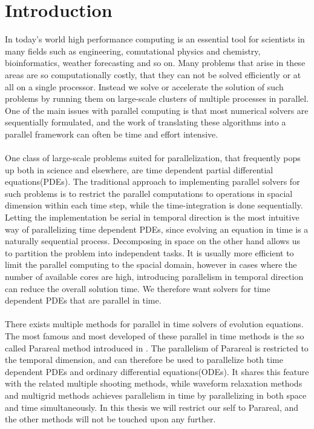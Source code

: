 \chapter{Introduction}
In today’s world high performance computing is an essential tool for scientists in many fields such as engineering, comutational physics and chemistry, bioinformatics, weather forecasting and so on. Many problems that arise in these areas are so computationally costly, that they can not be solved efficiently or at all on a single processor. Instead we solve or accelerate the solution of such problems by running them on large-scale clusters of multiple processes in parallel. One of the main issues with parallel computing is that most numerical solvers are sequentially formulated, and the work of translating these algorithms into a parallel framework can often be time and effort intensive.
\\
\\
One class of large-scale problems suited for parallelization, that frequently pops up both in science and elsewhere, are time dependent partial differential equations(PDEs). The traditional approach to implementing parallel solvers for such problems is to restrict the parallel computations to operations in spacial dimension within each time step, while the time-integration is done sequentially. Letting the implementation be serial in temporal direction is the most intuitive way of parallelizing time dependent PDEs, since evolving an equation in time is a naturally sequential process. Decomposing in space on the other hand allows us to partition the problem into independent tasks. It is usually more efficient to limit the parallel computing to the spacial domain, however in cases where the number of available cores are high, introducing parallelism in temporal direction can reduce the overall solution time. We therefore want solvers for time dependent PDEs that are parallel in time.
\\
\\
There exists multiple methods for parallel in time solvers of evolution equations. The most famous and most developed of these parallel in time methods is the so called Parareal method introduced in \cite{lions2001resolution}. The parallelism of Parareal is restricted to the temporal dimension, and can therefore be used to parallelize both time dependent PDEs and ordinary differential equations(ODEs). It shares this feature with the related multiple shooting methods\cite{nievergelt1964parallel,bellen1989parallel}, while waveform relaxation methods\cite{lelarasmee1982waveform,gander1996overlapping} and multigrid methods\cite{hackbusch1985parabolic,lubich1987multi,horton1995space} achieves parallelism in time by parallelizing in both space and time simultaneously. In this thesis we will restrict our self to Parareal, and the other methods will not be touched upon any further.
